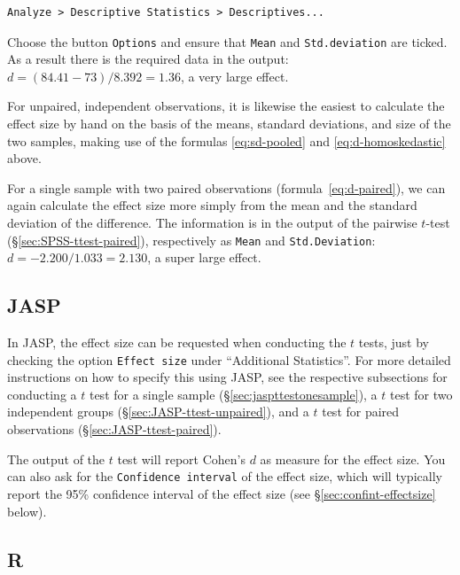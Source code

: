 \documentclass[
]{book}
\begin{document}
\begin{verbatim}
Analyze > Descriptive Statistics > Descriptives...
\end{verbatim}

Choose the button \texttt{Options} and ensure that \texttt{Mean} and \texttt{Std.deviation} are
ticked. As a result there is the required data in the output:\\
\(d = (84.41 - 73) / 8.392 = 1.36\), a very large effect.

For unpaired, independent observations, it is likewise the easiest
to calculate the effect size by hand on the basis of the
means, standard deviations, and size of the two samples, making use
of the formulas
\eqref{eq:sd-pooled} and
\eqref{eq:d-homoskedastic} above.

For a single sample with two paired observations
(formula~\eqref{eq:d-paired}), we can again calculate the effect
size more simply from the mean and the standard deviation of the difference.
The information is in the output of the pairwise \(t\)-test\\
(§\ref{sec:SPSS-ttest-paired}), respectively as \texttt{Mean} and
\texttt{Std.Deviation}:\\
\(d = -2.200 / 1.033 = 2.130\), a super large effect.

\subsection{JASP}\label{jasp-12}

In JASP, the effect size can be requested when conducting the \(t\) tests, just by checking the option \texttt{Effect\ size} under ``Additional Statistics''. For more detailed instructions on how to specify this using JASP, see the respective subsections for conducting a \(t\) test for a single sample (§\ref{sec:jaspttestonesample}), a \(t\) test for two independent groups (§\ref{sec:JASP-ttest-unpaired}), and a \(t\) test for paired observations (§\ref{sec:JASP-ttest-paired}).

The output of the \(t\) test will report Cohen's \(d\) as measure for the effect size. You can also ask for the \texttt{Confidence\ interval} of the effect size, which will typically report the 95\% confidence interval of the effect size (see §\ref{sec:confint-effectsize} below).

\subsection{R}\label{r-14}
\end{document}
